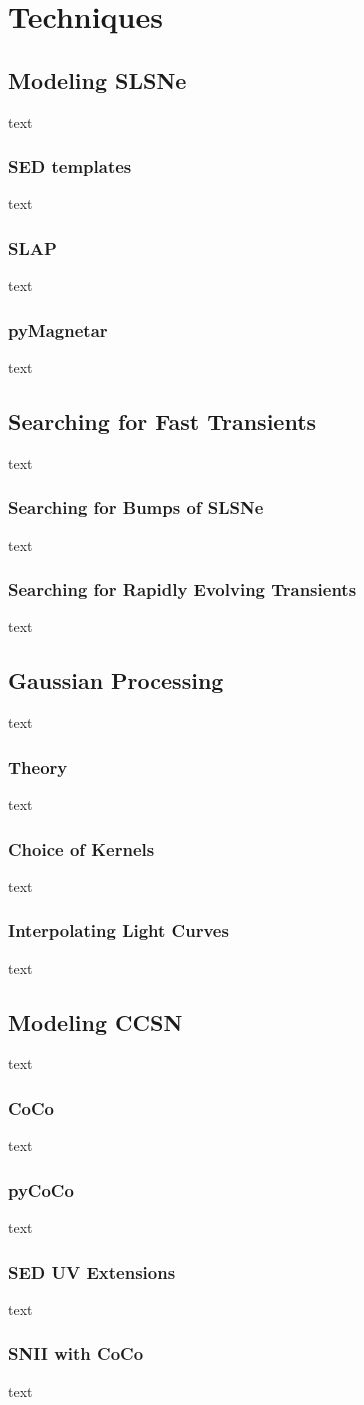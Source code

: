 
\chapter{Techniques} %
\label{Chapter4}

\section{Modeling SLSNe} \label{sec:SLAP}
text
\subsection{SED templates}
text
\subsection{SLAP}
text
\subsection{pyMagnetar}
text

\section{Searching for Fast Transients}
text
\subsection{Searching for Bumps of SLSNe}
text
\subsection{Searching for Rapidly Evolving Transients}
text

\section{Gaussian Processing}
text
\subsection{Theory}
text
\subsection{Choice of Kernels}
text
\subsection{Interpolating Light Curves}
text

\section{Modeling CCSN}
text
\subsection{CoCo}
text
\subsection{pyCoCo}
text
\subsection{SED UV Extensions}
text
\subsection{SNII with CoCo}
text
